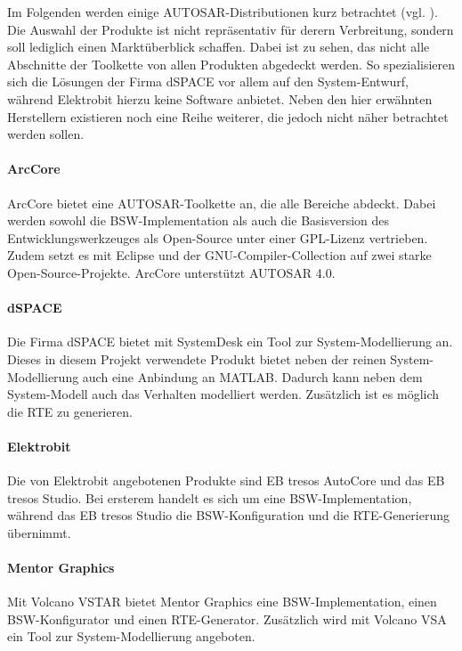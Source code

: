 \documentclass[
  a4paper,					    %
  twoside,
  DIV=calc,     				%
  bibliography=totoc,
  cleardoublepage=empty,
  ngerman,     					%
  final       					%
]{scrbook}
\begin{document}
Im Folgenden werden einige AUTOSAR-Distributionen kurz betrachtet (vgl. \cite{wiki:autosar}). Die Auswahl der Produkte ist nicht repräsentativ für derern Verbreitung, sondern soll lediglich einen Marktüberblick schaffen. Dabei ist zu sehen, das nicht alle Abschnitte der Toolkette von allen Produkten abgedeckt werden. So spezialisieren sich die Lösungen der Firma dSPACE vor allem auf den System-Entwurf, während Elektrobit hierzu keine Software anbietet. Neben den hier erwähnten Herstellern existieren noch eine Reihe weiterer, die jedoch nicht näher betrachtet werden sollen.

\paragraph{ArcCore}
ArcCore bietet eine AUTOSAR-Toolkette an, die alle Bereiche abdeckt. Dabei werden sowohl die BSW-Implementation als auch die Basisversion des Entwicklungswerkzeuges als Open-Source unter einer GPL-Lizenz vertrieben. Zudem setzt es mit Eclipse und der GNU-Compiler-Collection auf zwei starke Open-Source-Projekte. ArcCore unterstützt AUTOSAR 4.0.

\paragraph{dSPACE}
Die Firma dSPACE bietet mit SystemDesk ein Tool zur System-Modellierung an. Dieses in diesem Projekt verwendete Produkt bietet neben der reinen System-Modellierung auch eine Anbindung an MATLAB. Dadurch kann neben dem System-Modell auch das Verhalten modelliert werden. Zusätzlich ist es möglich die RTE zu generieren.

\paragraph{Elektrobit}
Die von Elektrobit angebotenen Produkte sind EB tresos AutoCore und das EB tresos Studio. Bei ersterem handelt es sich um eine BSW-Implementation, während das EB tresos Studio die BSW-Konfiguration und die RTE-Generierung übernimmt.

\paragraph{Mentor Graphics}
Mit Volcano VSTAR bietet Mentor Graphics eine BSW-Implementation, einen BSW-Konfigurator und einen RTE-Generator. Zusätzlich wird mit Volcano VSA ein Tool zur System-Modellierung angeboten.
\end{document}
